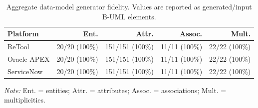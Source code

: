 \begin{table}[t]
\centering
\caption{Aggregate data-model generator fidelity. Values are reported as
generated/input B-UML elements.}
\label{tab:generator-data-model}
\scriptsize
\setlength{\tabcolsep}{4pt}
\renewcommand{\arraystretch}{1.05}
\begin{tabular}{lrrrr}
\toprule
Platform & Ent. & Attr. & Assoc. & Mult. \\
\midrule
ReTool
& 20/20 (100\%)
& 151/151 (100\%)
& 11/11 (100\%)
& 22/22 (100\%) \\
Oracle APEX
& 20/20 (100\%)
& 151/151 (100\%)
& 11/11 (100\%)
& 22/22 (100\%) \\
ServiceNow
& 20/20 (100\%)
& 151/151 (100\%)
& 11/11 (100\%)
& 22/22 (100\%) \\
\bottomrule
\end{tabular}
\vspace{0.3em}
\begin{minipage}{0.95\linewidth}
\footnotesize
\textit{Note:} Ent. = entities; Attr. = attributes; Assoc. = associations;
Mult. = multiplicities.
\end{minipage}
\end{table}
